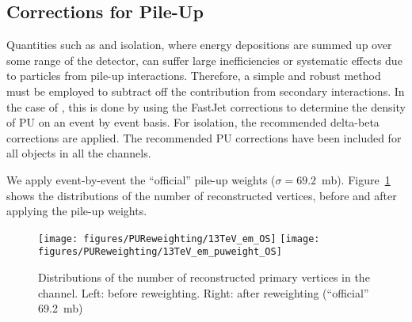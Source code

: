 \subsection{Corrections for Pile-Up}

Quantities such as \MET and isolation, where energy depositions are
summed up over some range of the detector, can suffer large
inefficiencies or systematic effects due to particles from pile-up
interactions. Therefore, a simple and robust method must be employed
to subtract off the contribution from secondary interactions.  In the
case of \MET, this is done by using the FastJet corrections to
determine the density of PU on an event by event basis. For isolation, the 
recommended delta-beta corrections are applied. The
recommended PU corrections have been included for all objects in all
the channels.




We apply event-by-event the ``official'' pile-up weights
($\sigma=69.2$~mb).  Figure~\ref{fig:nvtx} shows the distributions of
the number of reconstructed vertices, before and after applying the
pile-up weights.

\begin{figure}
  \centering
  \texttt{[image: figures/PUReweighting/13TeV\_em\_OS]}
  \texttt{[image: figures/PUReweighting/13TeV\_em\_puweight\_OS]} \\
  \caption{\label{fig:nvtx} Distributions of the number of
    reconstructed primary vertices in the \emu channel. 
Left: before reweighting.  Right: after reweighting
    (``official'' 69.2~mb)}
\end{figure}
